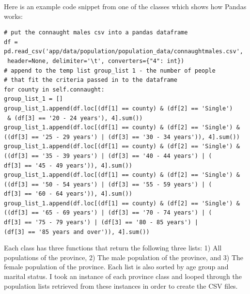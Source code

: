Here is an example code snippet from one of the classes which shows how Pandas works:
\linebreak
\linebreak
\begin{verbatim}
# put the connaught males csv into a pandas dataframe
df = pd.read_csv('app/data/population/population_data/connaughtmales.csv',
 header=None, delimiter='\t', converters={"4": int})
# append to the temp list group_list 1 - the number of people 
# that fit the criteria passed in to the dataframe
for county in self.connaught:
group_list_1 = []
group_list_1.append(df.loc[(df[1] == county) & (df[2] == 'Single')
 & (df[3] == '20 - 24 years'), 4].sum())
group_list_1.append(df.loc[(df[1] == county) & (df[2] == 'Single') &
((df[3] == '25 - 29 years') | (df[3] == '30 - 34 years')), 4].sum())
group_list_1.append(df.loc[(df[1] == county) & (df[2] == 'Single') &
((df[3] == '35 - 39 years') | (df[3] == '40 - 44 years') | (
df[3] == '45 - 49 years')), 4].sum())
group_list_1.append(df.loc[(df[1] == county) & (df[2] == 'Single') &
((df[3] == '50 - 54 years') | (df[3] == '55 - 59 years') | (
df[3] == '60 - 64 years')), 4].sum())
group_list_1.append(df.loc[(df[1] == county) & (df[2] == 'Single') &
((df[3] == '65 - 69 years') | (df[3] == '70 - 74 years') | (
df[3] == '75 - 79 years') | (df[3] == '80 - 85 years') |
(df[3] == '85 years and over')), 4].sum())
\end{verbatim}
Each class has three functions that return the following three lists: 1) All populations of the province, 2) The male population of the province, and 3) The female population of the province. Each list is also sorted by age group and marital status. I took an instance of each province class and looped through the population lists retrieved from these instances in order to create the CSV files. 
\pagebreak

